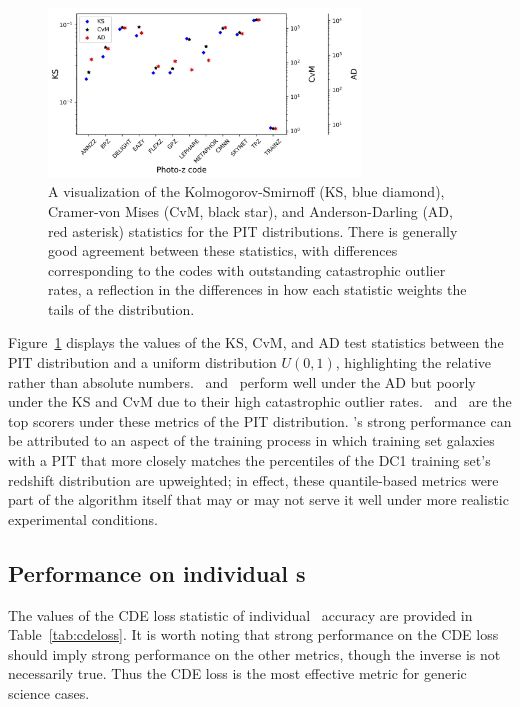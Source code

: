 \begin{figure}
\centering
\includegraphics[width=0.74\textwidth]{fig/KSvsCvMvsAD_PIT_withnull_jpg.jpg}
\caption{A visualization of the Kolmogorov-Smirnoff (KS, blue diamond), Cramer-von Mises (CvM, black star), and Anderson-Darling (AD, red asterisk) statistics for the PIT distributions.
There is generally good agreement between these statistics, with differences corresponding to the codes with outstanding catastrophic outlier rates, a reflection in the differences in how each statistic weights the tails of the distribution.}
\label{fig:pit_stats}
\end{figure}

Figure~\ref{fig:pit_stats} displays the values of the KS, CvM, and AD test statistics between the PIT distribution and a uniform distribution $U(0, 1)$, highlighting the relative rather than absolute numbers.
\metaphor\ and \lephare\ perform well under the AD but poorly under the KS and CvM due to their high catastrophic outlier rates.
\annz\ and \flexzboost\  are the top scorers under these metrics of the PIT distribution.
\annz's strong performance can be attributed to an aspect of the training process in which training set galaxies with a PIT that more closely matches the percentiles of the DC1 training set's redshift distribution are upweighted; in effect, these quantile-based metrics were part of the algorithm itself that may or may not serve it well under more realistic experimental conditions.

\subsection{Performance on individual \pzpdf s}
\label{sec:cdelossresults}

The values of the CDE loss statistic of individual \pzpdf\ accuracy are provided in Table~\ref{tab:cdeloss}.
It is worth noting that strong performance on the CDE loss should imply strong performance on the other metrics, though the inverse is not necessarily true.
Thus the CDE loss is the most effective metric for generic science cases.

